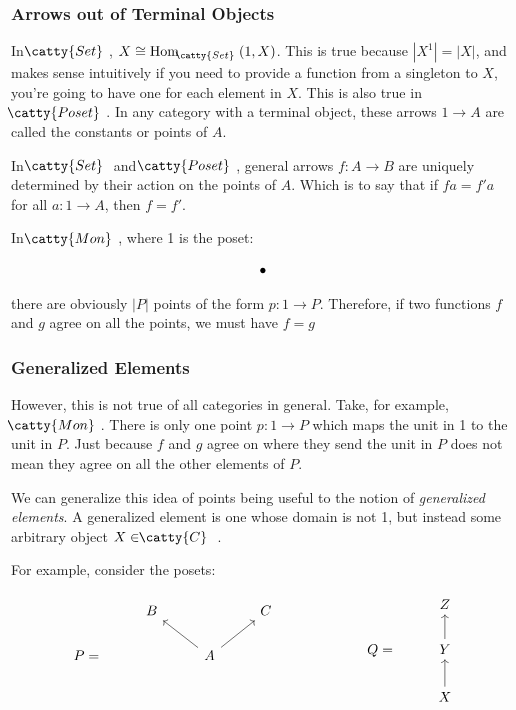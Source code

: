 \documentclass[]{article}
\newcommand{\abs}[1]{\left|#1\right|}
\newcommand{\tfarr}[4][\to]{\ensuremath{#2 : #3 #1 #4}}
\newcommand{\cat}[1]{\ensuremath{\!\! \catty{#1} \,\,}}
\begin{document}
\subsubsection{Arrows out of Terminal Objects}

In \cat{Set}, $X \cong \text{Hom}_{\cat{Set}}(1, X)$. This is true because
$\abs{X^1} = \abs{X}$, and makes sense intuitively if you need to provide a
function from a singleton to $X$, you're going to have one for each element in
$X$. This is also true in \cat{Poset}. In any category with a terminal object,
these arrows $1 \to A$ are called the constants or points of $A$.

In \cat{Set} and \cat{Poset}, general arrows \tfarr{f}{A}{B} are uniquely
determined by their action on the points of $A$. Which is to say that if $fa =
f'a$ for all \tfarr{a}{1}{A}, then $f = f'$.

In \cat{Mon}, where 1 is the poset:

$$\begin{tikzcd}
  \bullet
\end{tikzcd}$$

there are obviously $\abs{P}$ points of the form \tfarr{p}{1}{P}. Therefore, if
two functions $f$ and $g$ agree on all the points, we must have $f = g$

\subsubsection{Generalized Elements}

However, this is not true of all categories in general. Take, for example,
\cat{Mon}. There is only one point \tfarr{p}{1}{P} which maps the unit in 1 to
the unit in $P$. Just because $f$ and $g$ agree on where they send the unit in
$P$ does not mean they agree on all the other elements of $P$.

We can generalize this idea of points being useful to the notion of
\textit{generalized elements}. A generalized element is one whose domain is not
1, but instead some arbitrary object $X \in \cat{C}$ .

For example, consider the posets:

$$\begin{tikzcd}
      & B & & C \\
  P = &   & A \arrow{ur} \arrow{ul} & \\
      & \quad & &
\end{tikzcd} \qquad \qquad \qquad
\begin{tikzcd}
     & Z \\
  Q = & Y \arrow{u} \\
     & X \arrow{u}
\end{tikzcd}$$
\end{document}
